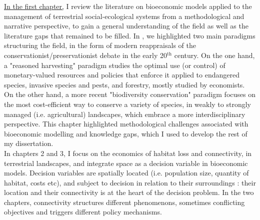 \hyperref[chapter1]{In the first chapter,} I review the literature on bioeconomic models applied to the management of terrestrial social-ecological systems from a methodological and narrative perspective, to gain a general understanding of the field as well as the literature gaps that remained to be filled. In \cite{jean_bioeconomic_2022},  we highlighted two main paradigms structuring the field, in the form of modern reappraisals of the conservationist/preservationist debate \citep{Banzhaf2019} in the early 20$^\mathrm{th}$ century. On the one hand, a "reasoned harvesting" paradigm studies the optimal use (or control) of monetary-valued resources and policies that enforce it applied to endangered species, invasive species and pests, and forestry, mostly studied by economists. On the other hand, a more recent "biodiversity conservation" paradigm focuses on the most cost-efficient way to conserve a variety of species, in weakly to strongly managed (i.e. agricultural) landscapes, which embrace a more interdisciplinary perspective. This chapter highlighted methodological challenges associated with bioeconomic modelling and knowledge gaps, which I used to develop the rest of my dissertation.
\\
In chapters 2 and 3, I focus on the economics of habitat loss and connectivity, in terrestrial landscapes, and integrate space as a decision variable in bioeconomic models. Decision variables are spatially located (i.e. population size, quantity of habitat, costs etc), and subject to decision in relation to their surroundings : their location and their connectivity is at the heart of the decision problem. In the two chapters, connectivity structures different phenomenons, sometimes conflicting objectives and triggers different policy mechanisms. \\

\begin{table}[H]
\centering
{}
\caption{Thematic divides of chapters}
\end{table}

